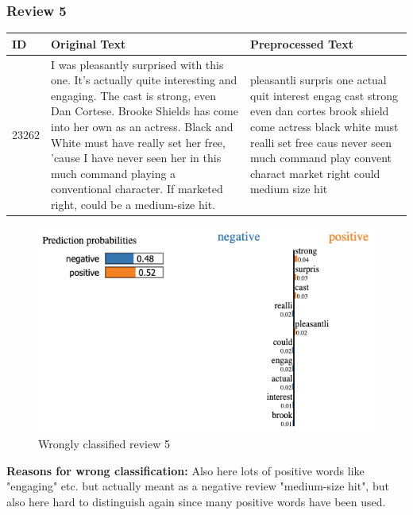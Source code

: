 \newpage
\subsubsection{Review 5}
\begin{tabularx}{\textwidth}{l|X|X}
\textbf{ID} & \textbf{Original Text} & \textbf{Preprocessed Text}\\
\hline
23262 &
I was pleasantly surprised with this one. It's actually quite interesting and engaging. The cast is strong, even Dan Cortese. Brooke Shields has come into her own as an actress. Black and White must have really set her free, 'cause I have never seen her in this much command playing a conventional character. If marketed right, could be a medium-size hit.
&
pleasantli surpris one actual quit interest engag cast strong even dan cortes brook shield come actress black white must realli set free caus never seen much command play convent charact market right could medium size hit
\end{tabularx}

\begin{figure}[htb!]
	\includegraphics[width=\textwidth]{img/review_5}
	\caption{Wrongly classified review 5}
\end{figure}

\textbf{Reasons for wrong classification:}
Also here lots of positive words like "engaging" etc. but actually meant as a negative review "medium-size hit", but also here hard to distinguish again since many positive words have been used.